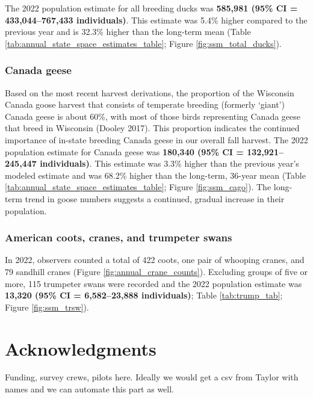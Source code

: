 \documentclass[
  12pt,
]{article}
\begin{document}
The 2022 population estimate for all breeding ducks was \textbf{585,981
(95\% CI = 433,044--767,433 individuals)}. This estimate was 5.4\%
higher compared to the previous year and is 32.3\% higher than the
long-term mean (Table \ref{tab:annual_state_space_estimates_table};
Figure \ref{fig:ssm_total_ducks}).

\hypertarget{canada-geese}{%
\subsubsection{Canada geese}\label{canada-geese}}

Based on the most recent harvest derivations, the proportion of the
Wisconsin Canada goose harvest that consists of temperate breeding
(formerly `giant') Canada geese is about 60\%, with most of those birds
representing Canada geese that breed in Wisconsin (Dooley 2017). This
proportion indicates the continued importance of in-state breeding
Canada geese in our overall fall harvest. The 2022 population estimate
for Canada geese was \textbf{180,340 (95\% CI = 132,921--245,447
individuals)}. This estimate was 3.3\% higher than the previous year's
modeled estimate and was 68.2\% higher than the long-term, 36-year mean
(Table \ref{tab:annual_state_space_estimates_table}; Figure
\ref{fig:ssm_cago}). The long-term trend in goose numbers suggests a
continued, gradual increase in their population.

\hypertarget{american-coots-cranes-and-trumpeter-swans}{%
\subsubsection{American coots, cranes, and trumpeter
swans}\label{american-coots-cranes-and-trumpeter-swans}}

In 2022, observers counted a total of 422 coots, one pair of whooping
cranes, and 79 sandhill cranes (Figure \ref{fig:annual_crane_counts}).
Excluding groups of five or more, 115 trumpeter swans were recorded and
the 2022 population estimate was \textbf{13,320 (95\% CI = 6,582--23,888
individuals)}; Table \ref{tab:trump_tab}; Figure \ref{fig:ssm_trsw}).

\newpage

\hypertarget{acknowledgments}{%
\section{Acknowledgments}\label{acknowledgments}}

Funding, survey crews, pilots here. Ideally we would get a csv from
Taylor with names and we can automate this part as well.
\end{document}
